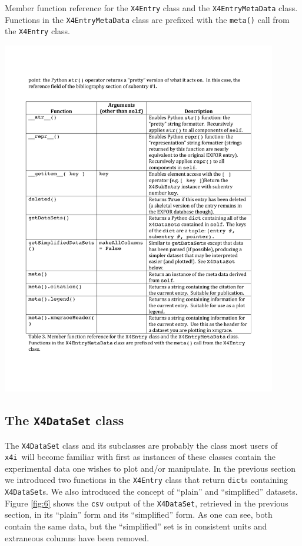 \documentclass[11pt]{article}
\newcommand{\xfouri}{\texttt{x4i}}
\begin{document}
\begin{table}
\caption{Member function reference for the \texttt{X4Entry} class and the \texttt{X4EntryMetaData} class. Functions in the \texttt{X4EntryMetaData} class are prefixed with the \texttt{meta()} call from the \texttt{X4Entry} class.}
\begin{center}
\includegraphics[width=0.9\textwidth]{tables/table3}
\end{center}
\label{tabels:x4entry}
\end{table}%


\subsection{The \texttt{X4DataSet} class}

The \texttt{X4DataSet} class and its subclasses are probably the class most users of \xfouri\ will become familiar with first as instances of these classes contain the experimental data one wishes to plot and/or manipulate.  In the previous section we introduced two functions in the \texttt{X4Entry} class that return \texttt{dict}s containing \texttt{X4DataSet}s.  We also introduced the concept of ``plain'' and ``simplified'' datasets.  Figure \ref{fig:6} shows the \texttt{csv} output of the \texttt{X4DataSet}, retrieved in the previous section, in its ``plain'' form and its ``simplified'' form.  As one can see, both contain the same data, but the ``simplified'' set is in consistent units and extraneous columns have been removed.
\end{document}
